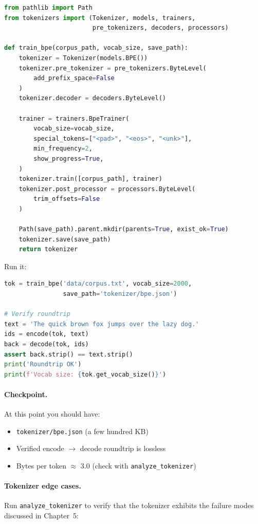 \begin{lstlisting}[language=python, caption={tokenizer.py --- BPE tokenizer training}]
from pathlib import Path
from tokenizers import (Tokenizer, models, trainers,
                        pre_tokenizers, decoders, processors)

def train_bpe(corpus_path, vocab_size, save_path):
    tokenizer = Tokenizer(models.BPE())
    tokenizer.pre_tokenizer = pre_tokenizers.ByteLevel(
        add_prefix_space=False
    )
    tokenizer.decoder = decoders.ByteLevel()

    trainer = trainers.BpeTrainer(
        vocab_size=vocab_size,
        special_tokens=["<pad>", "<eos>", "<unk>"],
        min_frequency=2,
        show_progress=True,
    )
    tokenizer.train([corpus_path], trainer)
    tokenizer.post_processor = processors.ByteLevel(
        trim_offsets=False
    )

    Path(save_path).parent.mkdir(parents=True, exist_ok=True)
    tokenizer.save(save_path)
    return tokenizer
\end{lstlisting}

Run it:

\begin{lstlisting}[language=python, caption={Tokenizer training and verification}]
tok = train_bpe('data/corpus.txt', vocab_size=2000,
                save_path='tokenizer/bpe.json')

# Verify roundtrip
text = 'The quick brown fox jumps over the lazy dog.'
ids = encode(tok, text)
back = decode(tok, ids)
assert back.strip() == text.strip()
print('Roundtrip OK')
print(f'Vocab size: {tok.get_vocab_size()}')
\end{lstlisting}

\paragraph{Checkpoint.}
At this point you should have:
\begin{itemize}[nosep]
  \item \texttt{tokenizer/bpe.json} (a few hundred KB)
  \item Verified encode $\to$ decode roundtrip is lossless
  \item Bytes per token $\approx$ 3.0 (check with \texttt{analyze\_tokenizer})
\end{itemize}

\paragraph{Tokenizer edge cases.}
Run \texttt{analyze\_tokenizer} to verify that the tokenizer exhibits the failure modes discussed in Chapter~5:

